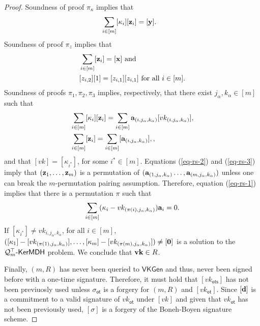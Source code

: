 \begin{proof}
Soundness of proof $\pi_\kappa$ implies that
\begin{align*}
&\sum_{i\in[m]}[\kappa_i][\mathbf{z}_i]=[\mathbf{y}].
\end{align*}
Soundness of proof $\pi_z$ implies that
\begin{align}
&\sum_{i\in[m]}[\mathbf{z}_i]=[\mathbf{x}]\text{ and}\nonumber\\
&[z_{i,2}][1]=[z_{i,1}][z_{i,1}] \text{ for all }i\in[m].\label{eq-rs-3}
\end{align}
Soundness of proofs $\pi_1,\pi_2,\pi_3$ implies, respectively, that there exist $j_\alpha,k_\alpha\in[m]$ such that
\begin{align}
&\sum_{i\in[m]}[\kappa_i][\mathbf{z}_i]=\sum_{i\in[m]}\mathbf{a}_{(i,j_\alpha,k_\alpha)}[vk_{(i,j_\alpha,k_\alpha)}],\label{eq-rs-1}\\
&\sum_{i\in[m]}[\mathbf{z}_i]=\sum_{i\in[m]}[\mathbf{a}_{(i,j_\alpha,k_\alpha)}], \label{eq-rs-2},
\end{align}
and that $[vk]=[\kappa_{i^*}]$, for some $i^*\in[m]$. Equations (\ref{eq-rs-2}) and (\ref{eq-rs-3}) imply that $(\mathbf{z}_1,\ldots,\mathbf{z}_m)$ is a permutation of $(\mathbf{a}_{(1,j_\alpha,k_\alpha)}\ldots,\mathbf{a}_{(m,j_\alpha,k_\alpha)})$ unless one can break the $m$-permutation pairing assumption. Therefore, equation (\ref{eq-rs-1}) implies that there is a permutation $\pi$ such that
\begin{align}
\sum_{i\in[m]}(\kappa_i-vk_{(\pi(i),j_\alpha,k_\alpha)})\mathbf{a}_i=0.
\end{align}
If $[\kappa_{i^*}]\neq vk_{i,j_\alpha,k_\alpha}$, for all $i\in[m]$, $([\kappa_1]-[vk_{(\pi(1),j_\alpha,k_\alpha)}],\ldots,[\kappa_m]-[vk_{(\pi(m),j_\alpha,k_\alpha)}])\neq [\mathbf{0}]$ is a solution to the $\mathcal{Q}_m^\top\mbox{-}\mathsf{KerMDH}$ problem. We conclude that $\mathbf{vk}\in R$.

Finally, $(m,R)$ has never been queried to $\mathsf{VKGen}$ and thus, never been signed before with a one-time signature. Therefore, it must hold that $[vk_\mathsf{ots}]$ has not been previuosly used unless $\sigma_\mathsf{ot}$ is a forgery for $(m,R)$ and $[vk_\mathsf{ot}]$. Since $[\mathbf{d}]$ is a commitment to a valid signature of $vk_\mathsf{ot}$ under $[vk]$ and given that $vk_\mathsf{ot}$ has not been previously used, $[\sigma]$ is a forgery of the Boneh-Boyen signature scheme.
\end{proof}
